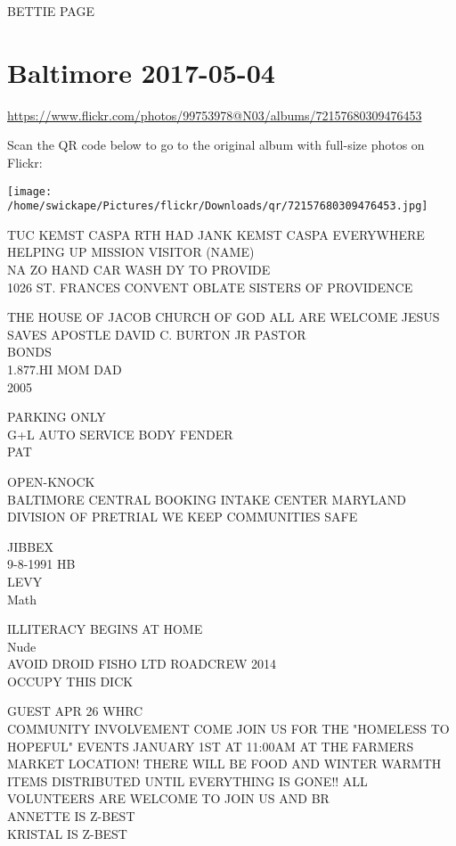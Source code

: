 \documentclass[10pt,letterpaper]{article}
\begin{document}
BETTIE PAGE
\pagebreak

\section*{Baltimore 2017-05-04}

\url{https://www.flickr.com/photos/99753978@N03/albums/72157680309476453}

Scan the QR code below to go to the original album with full-size photos on Flickr:

\texttt{[image: /home/swickape/Pictures/flickr/Downloads/qr/72157680309476453.jpg]}
\pagebreak

TUC KEMST CASPA RTH HAD JANK KEMST CASPA EVERYWHERE\\
HELPING UP MISSION VISITOR (NAME)\\
NA ZO HAND CAR WASH DY TO PROVIDE\\
1026 ST. FRANCES CONVENT OBLATE SISTERS OF PROVIDENCE

THE HOUSE OF JACOB CHURCH OF GOD ALL ARE WELCOME JESUS SAVES APOSTLE DAVID C. BURTON JR PASTOR\\
BONDS\\
1.877.HI MOM DAD\\
2005

PARKING ONLY\\
G+L AUTO SERVICE BODY FENDER\\
PAT

OPEN{-}KNOCK\\
BALTIMORE CENTRAL BOOKING INTAKE CENTER MARYLAND DIVISION OF PRETRIAL WE KEEP COMMUNITIES SAFE

JIBBEX\\
9{-}8{-}1991 HB\\
LEVY\\
Math

ILLITERACY BEGINS AT HOME\\
Nude\\
AVOID DROID FISHO LTD ROADCREW 2014\\
OCCUPY THIS DICK

GUEST APR 26 WHRC\\
COMMUNITY INVOLVEMENT COME JOIN US FOR THE "HOMELESS TO HOPEFUL" EVENTS JANUARY 1ST AT 11:00AM AT THE FARMERS MARKET LOCATION!  THERE WILL BE FOOD AND WINTER WARMTH ITEMS DISTRIBUTED UNTIL EVERYTHING IS GONE!!  ALL VOLUNTEERS ARE WELCOME TO JOIN US AND BR\\
ANNETTE IS Z{-}BEST\\
KRISTAL IS Z{-}BEST
\end{document}
